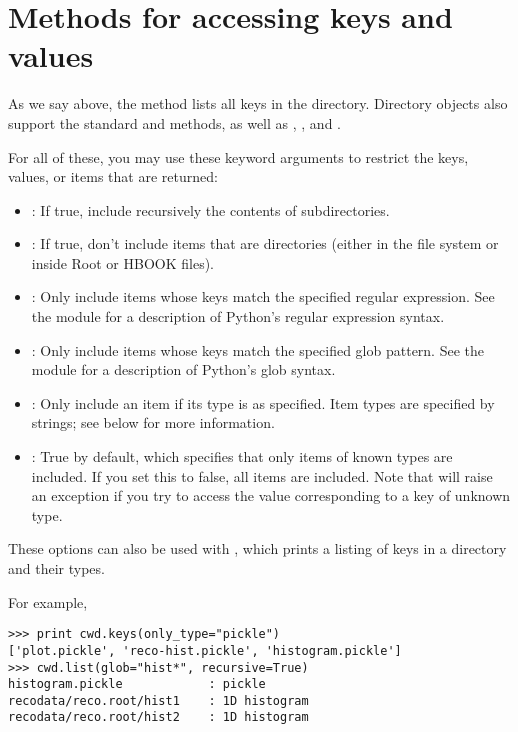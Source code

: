 
\section{Methods for accessing keys and values}

As we say above, the  method lists all keys in the
directory.  Directory objects also support the standard 
and  methods, as well as ,
, and .  

For all of these, you may use these keyword arguments to restrict the
keys, values, or items that are returned:
\begin{itemize}
 \item {}: If true, include recursively the contents of
 subdirectories. 

 \item {}: If true, don't include items that are directories
 (either in the file system or inside Root or HBOOK files).  

 \item {}: Only include items whose keys match the specified
 regular expression.  See the  module for a description of
 Python's regular expression syntax.

 \item {}: Only include items whose keys match the specified
 glob pattern.  See the  module for a description of
 Python's glob syntax.

 \item {}: Only include an item if its type is as
 specified.  Item types are specified by strings; see below for more
 information.

 \item {}: True by default, which specifies that only
 items of known types are included.  If you set this to false, all items
 are included.  Note that \pyhep will raise an exception if you try to
 access the value corresponding to a key of unknown type.

\end{itemize}

These options can also be used with , which prints a
listing of keys in a directory and their types.

For example,
\begin{verbatim}
>>> print cwd.keys(only_type="pickle")
['plot.pickle', 'reco-hist.pickle', 'histogram.pickle']
>>> cwd.list(glob="hist*", recursive=True)
histogram.pickle            : pickle
recodata/reco.root/hist1    : 1D histogram
recodata/reco.root/hist2    : 1D histogram
\end{verbatim}

